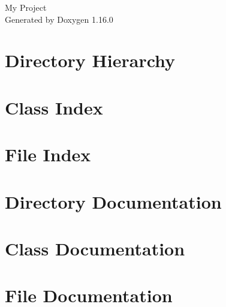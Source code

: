\documentclass[twoside]{book}
\newcommand{\+}{\discretionary{\mbox{\scriptsize$\hookleftarrow$}}{}{}}
\newcommand{\clearemptydoublepage}{%
    \newpage{\pagestyle{empty}\cleardoublepage}%
  }
\begin{document}
  \raggedbottom
    \hypersetup{pageanchor=false,
                bookmarksnumbered=true,
                pdfencoding=unicode
               }
  \begin{titlepage}
  \vspace*{7cm}
  \begin{center}%
  {\Large My Project}\\
  \vspace*{1cm}
  {\large Generated by Doxygen 1.16.0}\\
  \end{center}
  \end{titlepage}
  \clearemptydoublepage
  \tableofcontents
  \clearemptydoublepage
  \hypersetup{pageanchor=true}
\chapter{Directory Hierarchy}

\chapter{Class Index}

\chapter{File Index}

\chapter{Directory Documentation}







\chapter{Class Documentation}





\chapter{File Documentation}










  \backmatter
  \newpage
  \clearemptydoublepage
  \printindex
\end{document}
